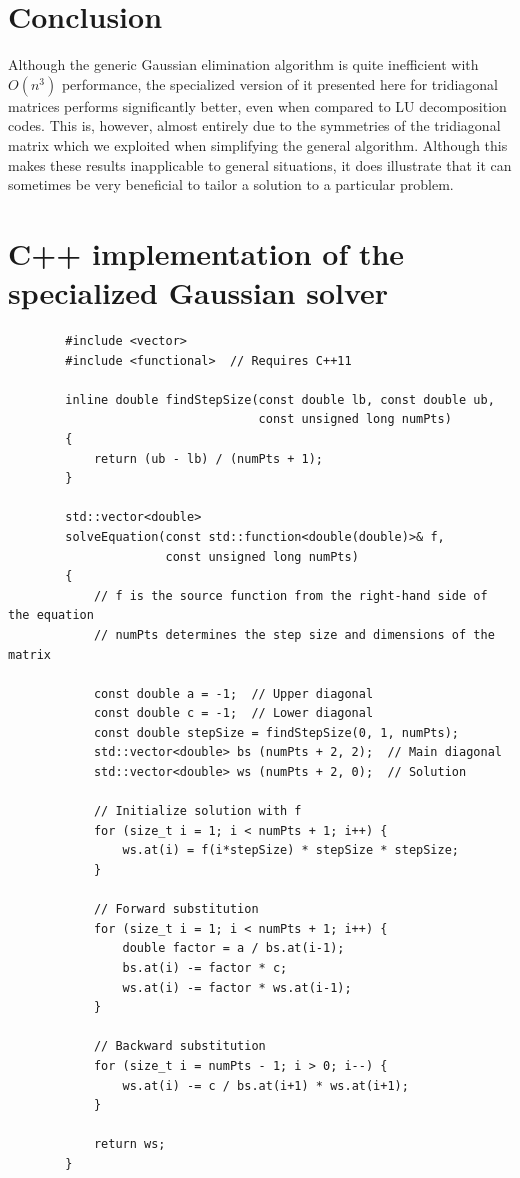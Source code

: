 \documentclass{article}
\begin{document}
\section{Conclusion}

    Although the generic Gaussian elimination algorithm is quite inefficient with $O(n^3)$ performance, the specialized version of it presented here for tridiagonal matrices performs significantly better, even when compared to LU decomposition codes. This is, however, almost entirely due to the symmetries of the tridiagonal matrix which we exploited when simplifying the general algorithm. Although this makes these results inapplicable to general situations, it does illustrate that it can sometimes be very beneficial to tailor a solution to a particular problem.

\pagebreak

\appendix

\section{C++ implementation of the specialized Gaussian solver}
\label{sec:cimpl}

    \begin{verbatim}
        #include <vector>
        #include <functional>  // Requires C++11

        inline double findStepSize(const double lb, const double ub,
                                   const unsigned long numPts)
        {
            return (ub - lb) / (numPts + 1);
        }

        std::vector<double>
        solveEquation(const std::function<double(double)>& f,
                      const unsigned long numPts)
        {
            // f is the source function from the right-hand side of the equation
            // numPts determines the step size and dimensions of the matrix

            const double a = -1;  // Upper diagonal
            const double c = -1;  // Lower diagonal
            const double stepSize = findStepSize(0, 1, numPts);
            std::vector<double> bs (numPts + 2, 2);  // Main diagonal
            std::vector<double> ws (numPts + 2, 0);  // Solution

            // Initialize solution with f
            for (size_t i = 1; i < numPts + 1; i++) {
                ws.at(i) = f(i*stepSize) * stepSize * stepSize;
            }

            // Forward substitution
            for (size_t i = 1; i < numPts + 1; i++) {
                double factor = a / bs.at(i-1);
                bs.at(i) -= factor * c;
                ws.at(i) -= factor * ws.at(i-1);
            }

            // Backward substitution
            for (size_t i = numPts - 1; i > 0; i--) {
                ws.at(i) -= c / bs.at(i+1) * ws.at(i+1);
            }

            return ws;
        }
    \end{verbatim}
\end{document}
